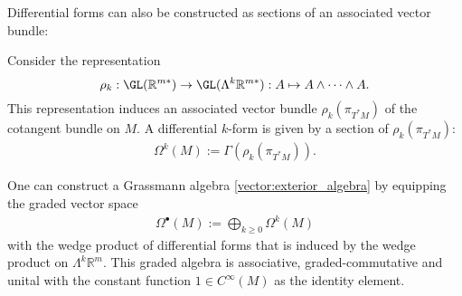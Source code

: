     Differential forms can also be constructed as sections of an associated vector bundle:
    \begin{adefinition}
        Consider the representation \[\rho_k:\GL(\mathbb{R}^{m*})\rightarrow\GL(\Lambda^k\mathbb{R}^{m*}): A\mapsto A\wedge\cdots\wedge A.\] This representation induces an associated vector bundle $\rho_k(\pi_{T^*M})$ of the cotangent bundle on $M$. A differential $k$-form is given by a section of $\rho_k(\pi_{T^*M})$:
        \begin{gather}
            \Omega^k(M) := \Gamma(\rho_k(\pi_{T^*M})).
        \end{gather}
    \end{adefinition}

    \begin{construct}
        One can construct a Grassmann algebra \ref{vector:exterior_algebra} by equipping the graded vector space
        \begin{gather}
            \Omega^\bullet(M) := \bigoplus_{k\geq0}\Omega^k(M)
        \end{gather}
        with the wedge product of differential forms that is induced by the wedge product on $\Lambda^k\mathbb{R}^m$. This graded algebra is associative, graded-commutative and unital with the constant function $1\in C^{\infty}(M)$ as the identity element.
    \end{construct}

